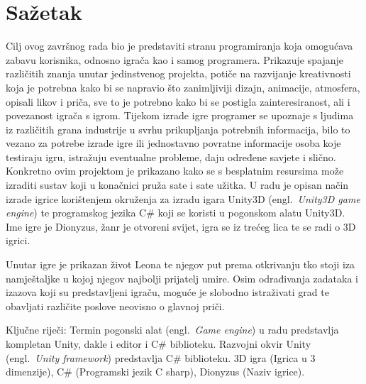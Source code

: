\section*{Sažetak}
\label{sec:summary}
Cilj ovog završnog rada bio je predstaviti stranu programiranja koja omogućava zabavu korisnika, odnosno igrača kao i samog programera. Prikazuje spajanje različitih znanja unutar jedinstvenog projekta, potiče na razvijanje kreativnosti koja je potrebna kako bi se napravio što zanimljiviji dizajn, animacije, atmosfera, opisali likov i priča, sve to je potrebno kako bi se postigla zainteresiranost, ali i povezanost igrača s igrom. Tijekom izrade igre programer se upoznaje s ljudima iz različitih grana industrije u svrhu prikupljanja potrebnih informacija, bilo to vezano za potrebe izrade igre ili jednostavno povratne informacije osoba koje testiraju igru, istražuju eventualne probleme, daju određene savjete i slično. Konkretno ovim projektom je prikazano kako se s besplatnim resursima može izraditi sustav koji u konačnici pruža sate i sate užitka. U radu je opisan način izrade igrice korištenjem okruženja za izradu igara Unity3D (engl.~\textit{Unity3D game engine}) te programskog jezika C\# koji se koristi u pogonskom alatu Unity3D. Ime igre je Dionyzus, žanr je otvoreni svijet, igra se iz trećeg lica te se radi o 3D igrici. 

Unutar igre je prikazan život Leona te njegov put prema otkrivanju tko stoji iza namještaljke u kojoj njegov najbolji prijatelj umire. Osim odrađivanja zadataka i izazova koji su predstavljeni igraču, moguće je slobodno istraživati grad te obavljati različite poslove neovisno o glavnoj priči.

Ključne riječi: Termin pogonski alat (engl.~\textit{Game engine}) u radu predstavlja kompletan Unity, dakle i editor i C\# biblioteku. Razvojni okvir Unity (engl.~\textit{Unity framework}) predstavlja C\# biblioteku. 3D igra (Igrica u 3 dimenzije), C\# (Programski jezik C sharp), Dionyzus (Naziv igrice).
